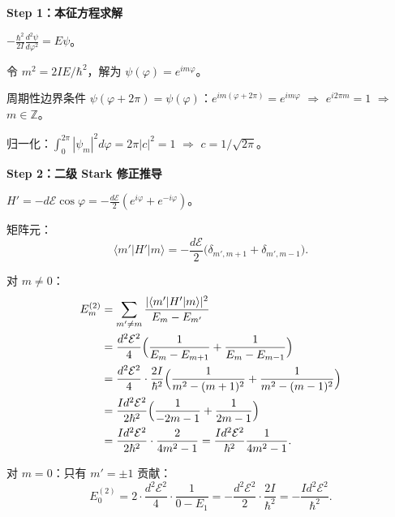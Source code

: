 \begin{derivationbox}
\textbf{Step 1：本征方程求解}

$-\frac{\hbar^2}{2I}\frac{d^2\psi}{d\varphi^2}=E\psi$。

令 $m^2=2IE/\hbar^2$，解为 $\psi(\varphi)=e^{im\varphi}$。

周期性边界条件 $\psi(\varphi+2\pi)=\psi(\varphi)$：$e^{im(\varphi+2\pi)}=e^{im\varphi}$ $\Rightarrow$ $e^{i2\pi m}=1$ $\Rightarrow$ $m\in\mathbb{Z}$。

归一化：$\int_0^{2\pi}|\psi_m|^2d\varphi=2\pi|c|^2=1$ $\Rightarrow$ $c=1/\sqrt{2\pi}$。

\textbf{Step 2：二级 Stark 修正推导}

$H'=-d\mathcal{E}\cos\varphi=-\frac{d\mathcal{E}}{2}(e^{i\varphi}+e^{-i\varphi})$。

矩阵元：
\[
\langle m'|H'|m\rangle=-\frac{d\mathcal{E}}{2}\bigl(\delta_{m',m+1}+\delta_{m',m-1}\bigr).
\]

对 $m\neq0$：
\begin{align*}
E_m^{(2)}&=\sum_{m'\neq m}\frac{|\langle m'|H'|m\rangle|^2}{E_m-E_{m'}}\\
&=\frac{d^2\mathcal{E}^2}{4}\Bigl(\frac{1}{E_m-E_{m+1}}+\frac{1}{E_m-E_{m-1}}\Bigr)\\
&=\frac{d^2\mathcal{E}^2}{4}\cdot\frac{2I}{\hbar^2}\Bigl(\frac{1}{m^2-(m+1)^2}+\frac{1}{m^2-(m-1)^2}\Bigr)\\
&=\frac{Id^2\mathcal{E}^2}{2\hbar^2}\Bigl(\frac{1}{-2m-1}+\frac{1}{2m-1}\Bigr)\\
&=\frac{Id^2\mathcal{E}^2}{2\hbar^2}\cdot\frac{2}{4m^2-1}
=\frac{Id^2\mathcal{E}^2}{\hbar^2}\frac{1}{4m^2-1}.
\end{align*}

对 $m=0$：只有 $m'=\pm1$ 贡献：
\[
E_0^{(2)}=2\cdot\frac{d^2\mathcal{E}^2}{4}\cdot\frac{1}{0-E_1}=-\frac{d^2\mathcal{E}^2}{2}\cdot\frac{2I}{\hbar^2}=-\frac{Id^2\mathcal{E}^2}{\hbar^2}.
\]
\end{derivationbox}

\vspace{1em}
